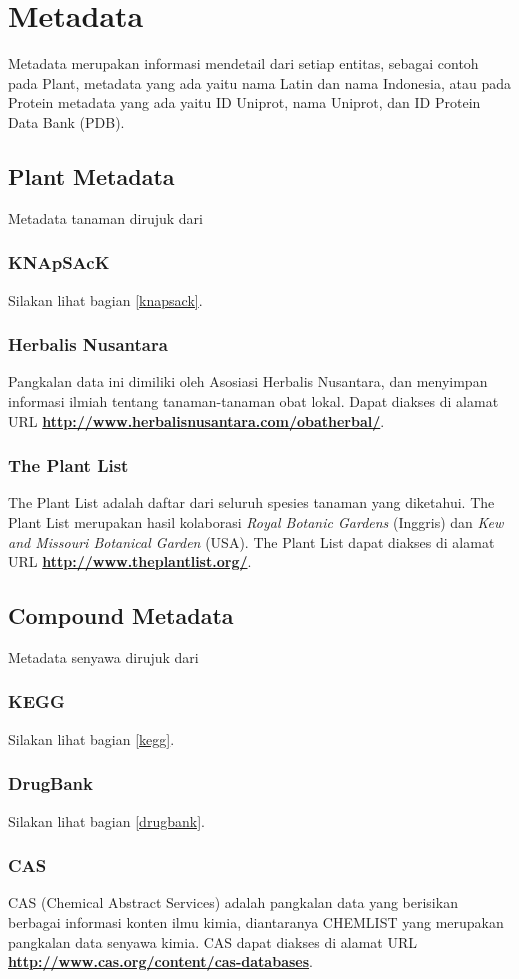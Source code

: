 \section{Metadata}
Metadata merupakan informasi mendetail dari setiap entitas, sebagai contoh pada Plant, metadata yang ada yaitu nama Latin dan nama Indonesia, atau pada Protein metadata yang ada yaitu ID Uniprot, nama Uniprot, dan ID Protein Data Bank (PDB).
	\subsection{Plant Metadata}
	Metadata tanaman dirujuk dari
		\subsubsection{KNApSAcK}
		Silakan lihat bagian \ref{knapsack}.
		\subsubsection{Herbalis Nusantara}
		Pangkalan data ini dimiliki oleh Asosiasi Herbalis Nusantara, dan menyimpan informasi ilmiah tentang tanaman-tanaman obat lokal. Dapat diakses di alamat URL \textbf{\url{http://www.herbalisnusantara.com/obatherbal/}}.
		\subsubsection{The Plant List} \label{the plant list}
		The Plant List adalah daftar dari seluruh spesies tanaman yang diketahui. The Plant List merupakan hasil kolaborasi \emph{Royal Botanic Gardens} (Inggris) dan \emph{Kew and Missouri Botanical Garden} (USA). The Plant List dapat diakses di alamat URL \textbf{\url{http://www.theplantlist.org/}}.

	\subsection{Compound Metadata}
	Metadata senyawa dirujuk dari
		\subsubsection{KEGG}
		Silakan lihat bagian \ref{kegg}.
		\subsubsection{DrugBank}
		Silakan lihat bagian \ref{drugbank}.
		\subsubsection{CAS} \label{cas}
		CAS (Chemical Abstract Services) adalah pangkalan data yang berisikan berbagai informasi konten ilmu kimia, diantaranya CHEMLIST yang merupakan pangkalan data senyawa kimia. CAS dapat diakses di alamat URL \textbf{\url{http://www.cas.org/content/cas-databases}}.

